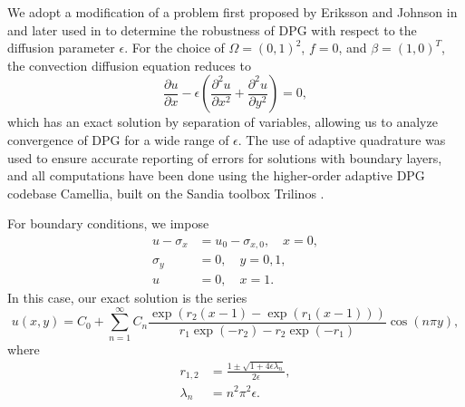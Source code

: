\documentclass[11pt,onecolumn]{scrartcl}
\newcommand{\pd}[2]{\frac{\partial#1}{\partial#2}}
\newcommand{\pdd}[2]{\frac{\partial^2#1}{\partial#2^2}}
\begin{document}
We adopt a modification of a problem first proposed by Eriksson and Johnson in \cite{Eriksson1993} and later used in \cite{DPGrobustness, ChanHeuerBui-ThanhDemkowicz12} to determine the robustness of DPG with respect to the diffusion parameter $\epsilon$. For the choice of $\Omega = (0,1)^2$, $f=0$, and $\beta = (1,0)^T$, the convection diffusion equation reduces to
\[
\pd{u}{x} - \epsilon \left(\pdd{u}{x}+ \pdd{u}{y}\right) = 0,
\]
which has an exact solution by separation of variables, allowing us to analyze convergence of DPG for a wide range of $\epsilon$. The use of adaptive quadrature was used to ensure accurate reporting of errors for solutions with boundary layers, and all computations have been done using the higher-order adaptive DPG codebase Camellia, built on the Sandia toolbox Trilinos \cite{Camellia}.

For boundary conditions, we impose
\begin{align*}
u-\sigma_x &= u_0-\sigma_{x,0}, \quad x=0,\\
\sigma_y &=  0, \quad y=0,1,\\
u &= 0, \quad x=1.
\end{align*}
In this case, our exact solution is the series
\[
u(x,y) = C_0 + \sum_{n=1}^\infty C_n \frac{\exp(r_2(x-1)-\exp(r_1(x-1)))}{r_1\exp(-r_2) - r_2\exp(-r_1)}\cos(n\pi y),
\]
where
\begin{align*}
r_{1,2} &= \frac{1 \pm \sqrt{1 + 4 \epsilon\lambda_n}}{2 \epsilon},\\
\lambda_n &= n^2\pi^2 \epsilon.
\end{align*}
\end{document}
